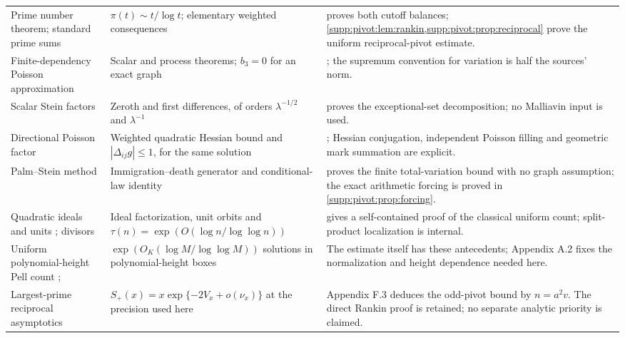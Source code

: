 \begin{longtable}{@{}L{.205\textwidth}L{.30\textwidth}L{.435\textwidth}@{}}
Prime number theorem; standard prime sums \cite{Tenenbaum2015}
& $\pi(t)\sim t/\log t$; elementary weighted consequences
&  proves both cutoff balances; \cref{supp:pivot:lem:rankin,supp:pivot:prop:reciprocal} prove the uniform reciprocal-pivot estimate.\\
Finite-dependency Poisson approximation \cite{ArratiaGoldsteinGordon1989,ArratiaGoldsteinGordon1990}
& Scalar and process theorems; $b_3=0$ for an exact graph
& ; the supremum convention for variation is half the sources' norm.\\
Scalar Stein factors \cite[(2.14)--(2.15)]{Krokowski2017}
& Zeroth and first differences, of orders $\lambda^{-1/2}$ and $\lambda^{-1}$
&  proves the exceptional-set decomposition; no Malliavin input is used.\\
Directional Poisson factor \cite[p.~179, Lemmas~2--3]{Barbour1988SteinProcess}
& Weighted quadratic Hessian bound and $|\Delta_{ij}g|\le1$, for the same solution
& ; Hessian conjugation, independent Poisson filling and geometric mark summation are explicit.\\
Palm--Stein method \cite{Barbour1988SteinProcess,ChenXia2004}
& Immigration--death generator and conditional-law identity
&  proves the finite total-variation bound with no graph assumption; the exact arithmetic forcing is proved in \cref{supp:pivot:prop:forcing}.\\
Quadratic ideals and units \cite{HalterKoch2013}; divisors \cite{NicolasRobin1983}
& Ideal factorization, unit orbits and $\tau(n)=\exp(O(\log n/\log\log n))$
&  gives a self-contained proof of the classical uniform count; split-product localization is internal.\\
Uniform polynomial-height Pell count \cite[arXiv text, Lemma~4]{CillerueloGaraev2011}; \cite[Lemma~2.10, Remark~2.12]{Tao2026}
& $\exp(O_K(\log M/\log\log M))$ solutions in polynomial-height boxes
& The estimate itself has these antecedents; Appendix A.2 fixes the normalization and height dependence needed here.\\
Largest-prime reciprocal asymptotics \cite[eq.~(1.3)]{ErdosIvicPomerance1986}
& $S_+(x)=x\exp\{-2V_x+o(\nu_x)\}$ at the precision used here
& Appendix F.3 deduces the odd-pivot bound by $n=a^2v$. The direct Rankin proof is retained; no separate analytic priority is claimed.\\

\end{longtable}
